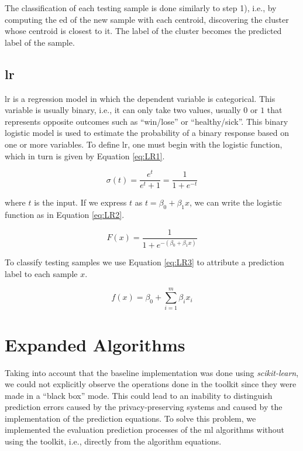The classification of each testing sample is done similarly to step 1), i.e., by computing the \ac{ed} of the new sample with each centroid, discovering the cluster whose centroid is closest to it. The label of the cluster becomes the predicted label of the sample.



\subsection{\acl{lr}}
\label{ssec:LogisticRegression}


\ac{lr} is a regression model in which the dependent variable is categorical. This variable is usually binary, i.e., it can only take two values, usually $0$ or $1$ that represents opposite outcomes such as ``win/lose'' or ``healthy/sick''.
This binary logistic model is used to estimate the probability of a binary response based on one or more variables.
To define \ac{lr}, one must begin with the logistic function, which in turn is given by Equation \ref{eq:LR1}.

\begin{equation}
\label{eq:LR1}
\sigma (t)={\frac {e^{t}}{e^{t}+1}}={\frac {1}{1+e^{-t}}}
\end{equation}

where $t$ is the input. If we express $t$ as $t=\beta _{0}+\beta _{1}x$, we can write the logistic function as in Equation \ref{eq:LR2}.

\begin{equation}
\label{eq:LR2}
F(x)={\frac {1}{1+e^{-(\beta _{0}+\beta _{1}x)}}}
\end{equation}


To classify testing samples we use Equation \ref{eq:LR3} to attribute a prediction label to each sample $x$.

\begin{equation}
\label{eq:LR3}
f(x)=\beta_0+\sum_{i=1}^m \beta_i x_i
\end{equation}

\section{Expanded Algorithms}
\label{sec:ExpandedAlgorithmsImplementation}


Taking into account that the baseline implementation was done using \textit{scikit-learn}, we could not explicitly observe the operations done in the toolkit since they were made in a ``black box'' mode. This could lead to an inability to distinguish prediction errors caused by the privacy-preserving systems and caused by the implementation of the prediction equations. To solve this problem, we implemented the evaluation prediction processes of the \ac{ml} algorithms without using the toolkit, i.e., directly from the algorithm equations.

